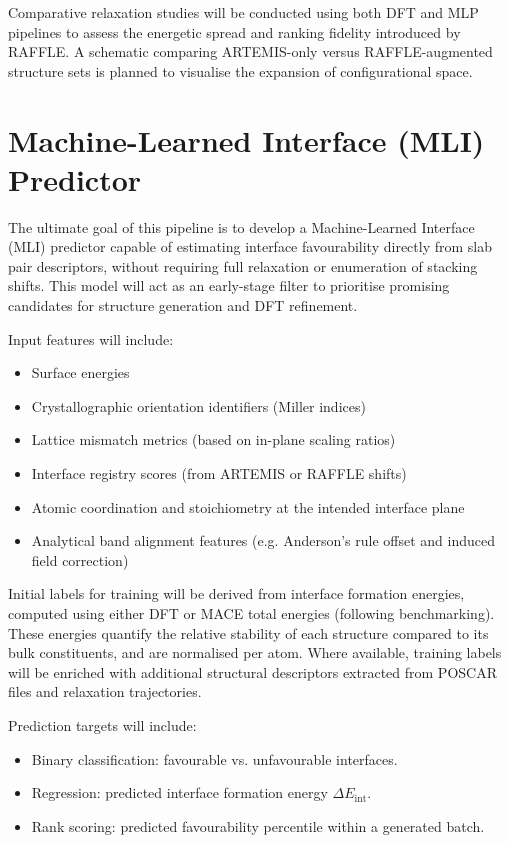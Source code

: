 Comparative relaxation studies will be conducted using both DFT and MLP pipelines to assess the energetic spread and ranking fidelity introduced by RAFFLE. A schematic comparing ARTEMIS-only versus RAFFLE-augmented structure sets is planned to visualise the expansion of configurational space.

\section{Machine-Learned Interface (MLI) Predictor}

The ultimate goal of this pipeline is to develop a Machine-Learned Interface (MLI) predictor capable of estimating interface favourability directly from slab pair descriptors, without requiring full relaxation or enumeration of stacking shifts.
This model will act as an early-stage filter to prioritise promising candidates for structure generation and DFT refinement.

Input features will include:

\begin{itemize}
    \item Surface energies
    \item Crystallographic orientation identifiers (Miller indices)
    \item Lattice mismatch metrics (based on in-plane scaling ratios)
    \item Interface registry scores (from ARTEMIS or RAFFLE shifts)
    \item Atomic coordination and stoichiometry at the intended interface plane
    \item Analytical band alignment features (e.g. Anderson's rule offset and induced field correction)
\end{itemize}

Initial labels for training will be derived from interface formation energies, computed using either DFT or MACE total energies (following benchmarking).
These energies quantify the relative stability of each structure compared to its bulk constituents, and are normalised per atom.
Where available, training labels will be enriched with additional structural descriptors extracted from POSCAR files and relaxation trajectories.

Prediction targets will include:

\begin{itemize}
    \item Binary classification: favourable vs. unfavourable interfaces.
    \item Regression: predicted interface formation energy $\Delta E_{\mathrm{int}}$.
    \item Rank scoring: predicted favourability percentile within a generated batch.
\end{itemize}

